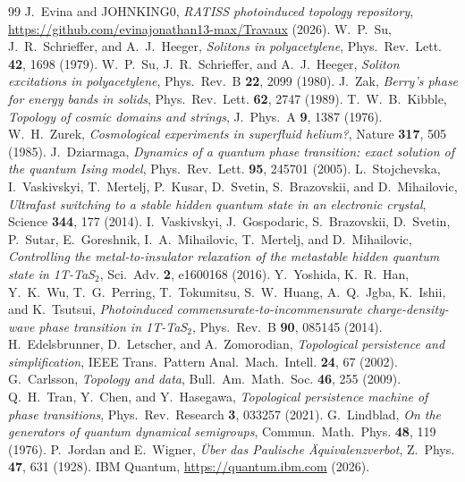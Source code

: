 \documentclass[11pt]{article}
\begin{document}
\begin{thebibliography}{99}
 J.~Evina and JOHNKING0, \emph{RATISS photoinduced topology
repository}, \url{https://github.com/evinajonathan13-max/Travaux} (2026).
 W.~P.~Su, J.~R.~Schrieffer, and A.~J.~Heeger,
\emph{Solitons in polyacetylene}, Phys.~Rev.~Lett. \textbf{42}, 1698 (1979).
 W.~P.~Su, J.~R.~Schrieffer, and A.~J.~Heeger,
\emph{Soliton excitations in polyacetylene}, Phys.~Rev.~B \textbf{22}, 2099
(1980).
 J.~Zak, \emph{Berry's phase for energy bands in solids},
Phys.~Rev.~Lett. \textbf{62}, 2747 (1989).
 T.~W.~B.~Kibble, \emph{Topology of cosmic domains and
strings}, J.~Phys.~A \textbf{9}, 1387 (1976).
 W.~H.~Zurek, \emph{Cosmological experiments in
superfluid helium?}, Nature \textbf{317}, 505 (1985).
 J.~Dziarmaga, \emph{Dynamics of a quantum phase
transition: exact solution of the quantum Ising model}, Phys.~Rev.~Lett.
\textbf{95}, 245701 (2005).
 L.~Stojchevska, I.~Vaskivskyi, T.~Mertelj,
P.~Kusar, D.~Svetin, S.~Brazovskii, and D.~Mihailovic, \emph{Ultrafast
switching to a stable hidden quantum state in an electronic crystal},
Science \textbf{344}, 177 (2014).
 I.~Vaskivskyi, J.~Gospodaric, S.~Brazovskii,
D.~Svetin, P.~Sutar, E.~Goreshnik, I.~A.~Mihailovic, T.~Mertelj, and
D.~Mihailovic, \emph{Controlling the metal-to-insulator relaxation of the
metastable hidden quantum state in 1T-TaS$_2$}, Sci.~Adv. \textbf{2},
e1600168 (2016).
 Y.~Yoshida, K.~R.~Han, Y.~K.~Wu, T.~G.~Perring,
T.~Tokumitsu, S.~W.~Huang, A.~Q.~Jgba, K.~Ishii, and K.~Tsutsui,
\emph{Photoinduced commensurate-to-incommensurate charge-density-wave phase
transition in 1T-TaS$_2$}, Phys.~Rev.~B \textbf{90}, 085145 (2014).
 H.~Edelsbrunner, D.~Letscher, and A.~Zomorodian,
\emph{Topological persistence and simplification}, IEEE Trans.~Pattern
Anal.~Mach.~Intell. \textbf{24}, 67 (2002).
 G.~Carlsson, \emph{Topology and data},
Bull.~Am.~Math.~Soc. \textbf{46}, 255 (2009).
 Q.~H.~Tran, Y.~Chen, and Y.~Hasegawa,
\emph{Topological persistence machine of phase transitions},
Phys.~Rev.~Research \textbf{3}, 033257 (2021).
 G.~Lindblad, \emph{On the generators of quantum
dynamical semigroups}, Commun.~Math.~Phys. \textbf{48}, 119 (1976).
 P.~Jordan and E.~Wigner, \emph{\"Uber das Paulische
\"Aquivalenzverbot}, Z.~Phys. \textbf{47}, 631 (1928).
 IBM Quantum, \url{https://quantum.ibm.com} (2026).
\end{thebibliography}
\end{document}
